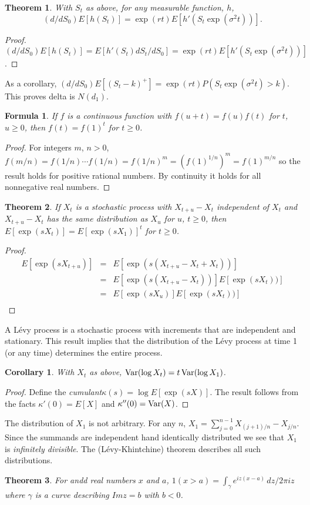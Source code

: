 \documentclass[11pt,fleqn]{amsart}
\newcommand{\Var}{\mathop{\rm{Var}}}
\newtheorem{thm}{Theorem}[section]
\newtheorem{cor}{Corollary}[section]
\newtheorem{formula}{Formula}[section]
\begin{document}
\begin{thm}
With $S_t$ as above, for any measurable function, $h$,
$$(d/dS_0)E[h(S_t)] = \exp(rt) E[h'(S_t\exp(\sigma^2t))].$$
\end{thm}
\begin{proof}
$(d/dS_0)E[h(S_t)] = E[h'(S_t) dS_t/dS_0] = \exp(rt) E[h'(S_t\exp(\sigma^2 t))]$.
\end{proof}

As a corollary, $(d/dS_0)E[(S_t - k)^+] = \exp(rt) P(S_t\exp(\sigma^2 t) > k)$.
This proves delta is $N(d_1)$.

\begin{formula}
If $f$ is a continuous function with $f(u + t) = f(u) f(t)$ for $t$, $u\ge0$,
then $f(t) = f(1)^t$ for $t\ge 0$.
\end{formula}
\begin{proof}
For integers $m$, $n>0$, $f(m/n) = f(1/n)\cdots f(1/n) = f(1/n)^m = (f(1)^{1/n})^m
= f(1)^{m/n}$ so the result holds for positive rational numbers. By continuity it 
holds for all nonnegative real numbers.
\end{proof}

\begin{thm}
If $X_t$ is a stochastic process with $X_{t + u} - X_t$ independent of $X_t$
and $X_{t + u} - X_t$ has the same distribution as $X_u$ for $u$, $t\ge 0$,
then $E[\exp(s X_t)] = E[\exp(s X_1)]^t$ for $t\ge 0$.
\end{thm}
\begin{proof}
\begin{eqnarray*}
E[\exp(s X_{t + u})] &=& E[\exp(s (X_{t + u} - X_t + X_t))] \\
	&=& E[\exp(s (X_{t + u} - X_t))] E[\exp(s X_t))] \\
	&=& E[\exp(s X_u)] E[\exp(s X_t))] \\
\end{eqnarray*}
\end{proof}

A L\'evy process is a stochastic process with increments that are independent
and stationary. This result implies that the distribution of the L\'evy
process at time 1 (or any time) determines the entire process.

\begin{cor}
With $X_t$ as above, $\Var(\log X_t) = t\Var(\log X_1)$.
\end{cor}
\begin{proof}
Define the {\em cumulant}$\kappa(s) = \log E[\exp(s X)]$. The
result follows from the facts
$\kappa'(0) = E[X]$ and $\kappa''(0) = \Var(X)$.
\end{proof}

The distribution of $X_1$ is not arbitrary. For any $n$,
$X_1 = \sum_{j = 0}^{n - 1} X_{(j+1)/n} - X_{j/n}$. Since the
summands are independent hand identically distributed we
see that $X_1$ is {\em infinitely divisible}. The
(L\'evy-Khintchine) theorem describes all such distributions.

\begin{thm}
For andd real numbers $x$ and $a$, $1(x > a)
= \int_\gamma e^{iz(x - a)}\,dz/2\pi iz$ where
$\gamma$ is a curve describing $Im z = b$ with $b < 0$.
\end{thm}

\end{document}
